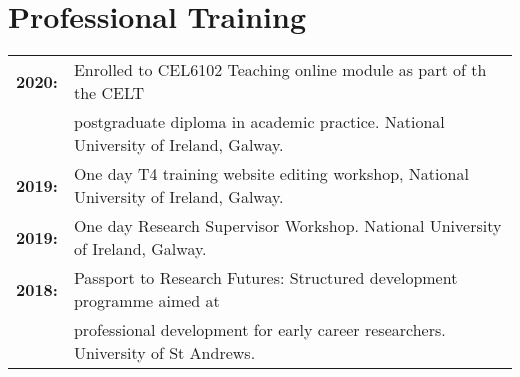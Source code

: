 \documentclass[10pt,a4paper]{article}
\begin{document}
\section{\textbf{Professional Training}}
\begin{tabular}{ll}

\textbf{2020:} & Enrolled to CEL6102 Teaching online module as part of th the CELT\\
& postgraduate diploma in academic practice. National University of Ireland, Galway.\\
\textbf{2019:} & One day T4 training website editing workshop, National University of Ireland, Galway.\\
\textbf{2019:} & One day Research Supervisor Workshop. National University of Ireland, Galway.\\
\textbf{2018:} & Passport to Research Futures: Structured development programme aimed at\\
& professional development for early career researchers. University of St Andrews.\\
\end{tabular}

\bigskip
\end{document}
